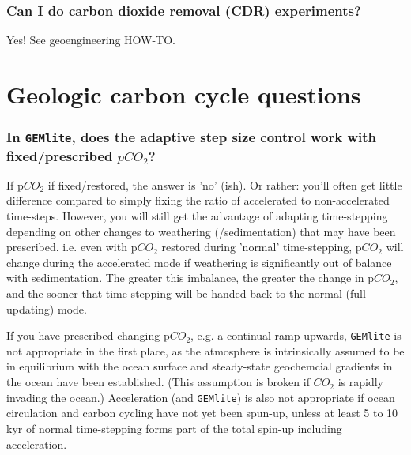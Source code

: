 \documentclass[11pt,fleqn]{book} %
\begin{document}
%
\subsubsection{Can I do carbon dioxide removal (CDR) experiments?}

Yes! See geoengineering HOW-TO.


\newpage


\section{Geologic carbon cycle questions}

%
\subsubsection{In \texttt{GEMlite}, does the adaptive step size control work with fixed/prescribed \(pCO_{2}\)?}

If p\(CO_{2}\) if fixed/restored, the answer is 'no' (ish). Or rather: you'll often get little difference compared to simply fixing the ratio of accelerated to 
non-accelerated time-steps.
However, you will still get the advantage of adapting time-stepping depending on other changes to weathering (/sedimentation) that may have been prescribed. i.e. even with p\(CO_{2}\) restored during 'normal' time-stepping, p\(CO_{2}\) will change during the accelerated mode if weathering is significantly out of balance with sedimentation. The greater this imbalance, the greater the change in p\(CO_{2}\), and the sooner that time-stepping will be handed back to the normal (full updating) mode.

If you have prescribed changing p\(CO_{2}\), e.g. a continual ramp upwards, \texttt{GEMlite} is not appropriate in the first place, as the atmosphere is intrinsically assumed to be in equilibrium with the ocean surface and steady-state geochemcial gradients in the ocean have been established. (This assumption is broken if \(CO_{2}\) is rapidly invading the ocean.)
Acceleration (and \texttt{GEMlite}) is also not appropriate if  ocean circulation and carbon cycling have not yet been spun-up, unless at least 5 to 10 kyr of normal time-stepping forms part of the total spin-up including acceleration. 
%
\end{document}
